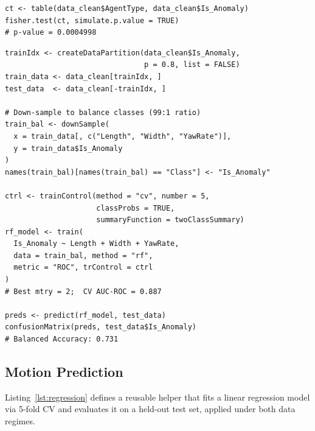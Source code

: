 \documentclass[conference]{IEEEtran}
\begin{document}
\begin{lstlisting}[style=Rstyle, caption={Fisher's Exact Test for agent-type association.}, label={lst:fisher}]
ct <- table(data_clean$AgentType, data_clean$Is_Anomaly)
fisher.test(ct, simulate.p.value = TRUE)
# p-value = 0.0004998
\end{lstlisting}

\begin{lstlisting}[style=Rstyle, caption={Random Forest classifier with 5-fold CV.}, label={lst:rf}]
trainIdx <- createDataPartition(data_clean$Is_Anomaly,
                                p = 0.8, list = FALSE)
train_data <- data_clean[trainIdx, ]
test_data  <- data_clean[-trainIdx, ]

# Down-sample to balance classes (99:1 ratio)
train_bal <- downSample(
  x = train_data[, c("Length", "Width", "YawRate")],
  y = train_data$Is_Anomaly
)
names(train_bal)[names(train_bal) == "Class"] <- "Is_Anomaly"

ctrl <- trainControl(method = "cv", number = 5,
                     classProbs = TRUE,
                     summaryFunction = twoClassSummary)
rf_model <- train(
  Is_Anomaly ~ Length + Width + YawRate,
  data = train_bal, method = "rf",
  metric = "ROC", trControl = ctrl
)
# Best mtry = 2;  CV AUC-ROC = 0.887

preds <- predict(rf_model, test_data)
confusionMatrix(preds, test_data$Is_Anomaly)
# Balanced Accuracy: 0.731
\end{lstlisting}

\vspace{150px}

\subsection{Motion Prediction}

Listing~\ref{lst:regression} defines a reusable helper that fits a linear regression model via 5-fold CV and evaluates it on a held-out test set, applied under both data regimes.
\end{document}
